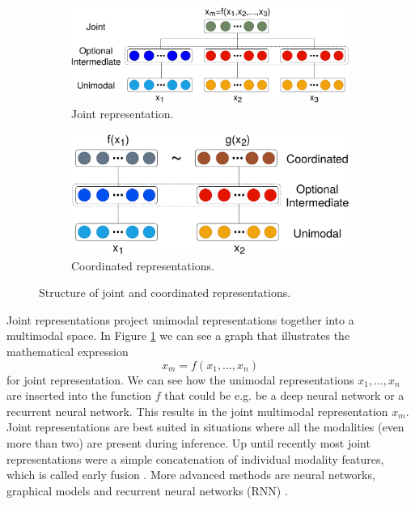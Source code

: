 \documentclass{article}
\begin{document}
\begin{figure}[H]
	\centering
	\begin{subfigure}[b]{0.54\linewidth}
		\includegraphics[width=\linewidth]{joint_reps.pdf}
		\caption{Joint representation.}
		\label{fig:reps1}	
	\end{subfigure}
	\begin{subfigure}[b]{0.43\linewidth}
		\includegraphics[width=\linewidth]{coordinated_reps.pdf}
		\caption{Coordinated representations.}
		\label{fig:reps2}	
	\end{subfigure}
	\caption{Structure of joint and coordinated representations.}
	\label{fig:reps}
\end{figure}

Joint representations project unimodal representations together into a multimodal space. In Figure \ref{fig:reps1} we can see a graph that illustrates the mathematical expression
\begin{equation}
x_m = f(x_1, \dots , x_n)
\end{equation}
for joint representation. We can see how the unimodal representations $x_1, \dots , x_n$ are inserted into the function $f$ that could be e.g. be a deep neural network or a recurrent neural network. This results in the joint multimodal representation $x_m$.
Joint representations are best suited in situations where all the modalities (even more than two) are present during inference. Up until recently most joint representations were a simple concatenation of individual modality features, which is called early fusion \citep{dmello2015review}. More advanced methods are neural networks, graphical models and recurrent neural networks (RNN) \citep{elman1990finding}.
\end{document}
